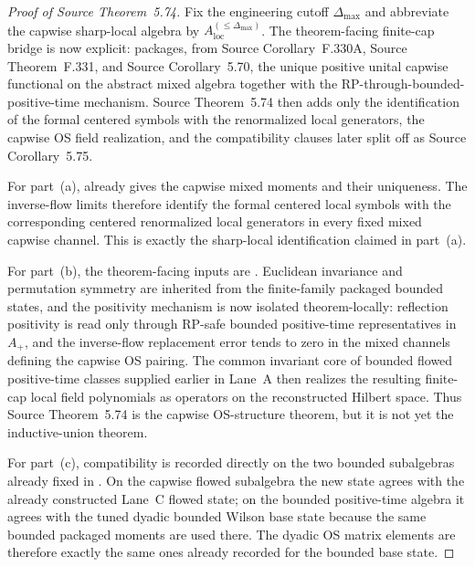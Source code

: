 \begin{proof}[Proof of Source Theorem~5.74]
Fix the engineering cutoff $\Delta_{\max}$ and abbreviate the capwise sharp-local algebra by $A_{\mathrm{loc}}^{(\le \Delta_{\max})}$. The theorem-facing finite-cap bridge is now explicit:  packages, from Source Corollary~F.330A, Source Theorem~F.331, and Source Corollary~5.70, the unique positive unital capwise functional on the abstract mixed algebra together with the RP-through-bounded-positive-time mechanism. Source Theorem~5.74 then adds only the identification of the formal centered symbols with the renormalized local generators, the capwise OS field realization, and the compatibility clauses later split off as Source Corollary~5.75.

For part~(a),  already gives the capwise mixed moments and their uniqueness. The inverse-flow limits therefore identify the formal centered local symbols with the corresponding centered renormalized local generators in every fixed mixed capwise channel. This is exactly the sharp-local identification claimed in part~(a).

For part~(b), the theorem-facing inputs are . Euclidean invariance and permutation symmetry are inherited from the finite-family packaged bounded states, and the positivity mechanism is now isolated theorem-locally: reflection positivity is read only through RP-safe bounded positive-time representatives in $A_+$, and the inverse-flow replacement error tends to zero in the mixed channels defining the capwise OS pairing. The common invariant core of bounded flowed positive-time classes supplied earlier in Lane~A then realizes the resulting finite-cap local field polynomials as operators on the reconstructed Hilbert space. Thus Source Theorem~5.74 is the capwise OS-structure theorem, but it is not yet the inductive-union theorem.

For part~(c), compatibility is recorded directly on the two bounded subalgebras already fixed in . On the capwise flowed subalgebra the new state agrees with the already constructed Lane~C flowed state; on the bounded positive-time algebra it agrees with the tuned dyadic bounded Wilson base state because the same bounded packaged moments are used there. The dyadic OS matrix elements are therefore exactly the same ones already recorded for the bounded base state.
\end{proof}


